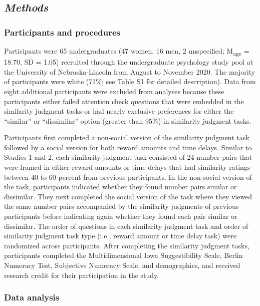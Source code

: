 \documentclass[
  pub,floatsintext]{apa6}
\begin{document}
\hypertarget{methods-2}{%
\subsection{\texorpdfstring{\emph{Methods}}{Methods}}\label{methods-2}}

\hypertarget{participants-and-procedures-2}{%
\subsubsection{Participants and procedures}\label{participants-and-procedures-2}}

Participants were 65 undergraduates (47 women, 16 men, 2 unspecified; M\textsubscript{age} = 18.70, SD = 1.05) recruited through the undergraduate psychology study pool at the University of Nebraska-Lincoln from August to November 2020. The majority of participants were white (71\%; see Table S1 for detailed description). Data from eight additional participants were excluded from analyses because these participants either failed attention check questions that were embedded in the similarity judgment tasks or had nearly exclusive preferences for either the ``similar'' or ``dissimilar'' option (greater than 95\%) in similarity judgment tasks.

Participants first completed a non-social version of the similarity judgment task followed by a social version for both reward amounts and time delays. Similar to Studies 1 and 2, each similarity judgment task consisted of 24 number pairs that were framed in either reward amounts or time delays that had similarity ratings between 40 to 60 percent from previous participants. In the non-social version of the task, participants indicated whether they found number pairs similar or dissimilar. They next completed the social version of the task where they viewed the same number pairs accompanied by the similarity judgments of previous participants before indicating again whether they found each pair similar or dissimilar. The order of questions in each similarity judgment task and order of similarity judgment task type (i.e., reward amount or time delay task) were randomized across participants. After completing the similarity judgment tasks, participants completed the Multidimensional Iowa Suggestibility Scale, Berlin Numeracy Test, Subjective Numeracy Scale, and demographics, and received research credit for their participation in the study.

\hypertarget{data-analysis-2}{%
\subsubsection{Data analysis}\label{data-analysis-2}}
\end{document}
